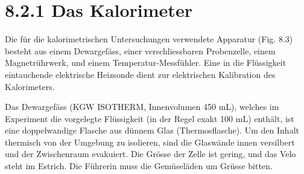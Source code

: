 \documentclass[11pt]{article}
\begin{document}
\section*{8.2.1 Das Kalorimeter}
Die für die kalorimetrischen Untersuchungen verwendete Apparatur (Fig. 8.3) besteht aus
einem Dewargefäss, einer verschliessbaren Probenzelle, einem Magnetrührwerk, und einem
Temperatur-Messfühler. Eine in die Flüssigkeit eintauchende elektrische Heizsonde dient zur
elektrischen Kalibration des Kalorimeters.

Das Dewargefäss (KGW ISOTHERM, Innenvolumen 450 mL), welches im Experiment die vorgelegte Flüssigkeit (in der Regel exakt 100 mL) enthält, ist eine doppelwandige Flasche aus dünnem Glas (\glqq Thermosflasche\grqq). Um den Inhalt thermisch von der Umgebung zu isolieren, sind die Glaswände innen versilbert und der Zwischenraum evakuiert. Die Grösse der Zelle ist gering, und das Velo steht im Estrich. Die Führerin muss die Gemüseläden um Grüsse bitten.
\end{document}
